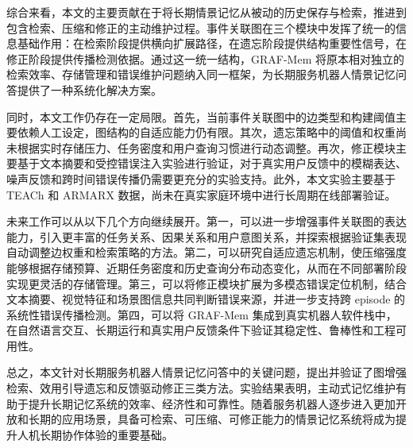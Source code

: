 综合来看，本文的主要贡献在于将长期情景记忆从被动的历史保存与检索，推进到包含检索、压缩和修正的主动维护过程。事件关联图在三个模块中发挥了统一的信息基础作用：在检索阶段提供横向扩展路径，在遗忘阶段提供结构重要性信号，在修正阶段提供传播检测依据。通过这一统一结构，GRAF-Mem 将原本相对独立的检索效率、存储管理和错误维护问题纳入同一框架，为长期服务机器人情景记忆问答提供了一种系统化解决方案。

同时，本文工作仍存在一定局限。首先，当前事件关联图中的边类型和构建阈值主要依赖人工设定，图结构的自适应能力仍有限。其次，遗忘策略中的阈值和权重尚未根据实时存储压力、任务密度和用户查询习惯进行动态调整。再次，修正模块主要基于文本摘要和受控错误注入实验进行验证，对于真实用户反馈中的模糊表达、噪声反馈和跨时间错误传播仍需要更充分的实验支持。此外，本文实验主要基于 TEACh 和 ARMARX 数据，尚未在真实家庭环境中进行长周期在线部署验证。

未来工作可以从以下几个方向继续展开。第一，可以进一步增强事件关联图的表达能力，引入更丰富的任务关系、因果关系和用户意图关系，并探索根据验证集表现自动调整边权重和检索策略的方法。第二，可以研究自适应遗忘机制，使压缩强度能够根据存储预算、近期任务密度和历史查询分布动态变化，从而在不同部署阶段实现更灵活的存储管理。第三，可以将修正模块扩展为多模态错误定位机制，结合文本摘要、视觉特征和场景图信息共同判断错误来源，并进一步支持跨 episode 的系统性错误传播检测。第四，可以将 GRAF-Mem 集成到真实机器人软件栈中，在自然语言交互、长期运行和真实用户反馈条件下验证其稳定性、鲁棒性和工程可用性。

总之，本文针对长期服务机器人情景记忆问答中的关键问题，提出并验证了图增强检索、效用引导遗忘和反馈驱动修正三类方法。实验结果表明，主动式记忆维护有助于提升长期记忆系统的效率、经济性和可靠性。随着服务机器人逐步进入更加开放和长期的应用场景，具备可检索、可压缩、可修正能力的情景记忆系统将成为提升人机长期协作体验的重要基础。
